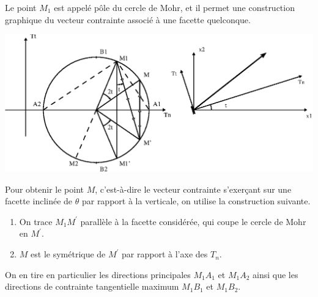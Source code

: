 Le point $M_1$ est appelé pôle du cercle de Mohr, et il permet une construction graphique du vecteur contrainte associé à une facette quelconque.
\begin{center}
    \includegraphics{../images/T1_Ch02-0018}
\end{center}
Pour obtenir le point $M$, c'est-à-dire le vecteur contrainte s'exerçant sur une facette inclinée de $\theta$ par rapport à la verticale, on utilise la construction suivante.
\begin{enumerate}
    \item On trace $M_1 M^{\prime}$ parallèle à la facette considérée, qui coupe le cercle de Mohr en $M^{\prime}$.
    \item $M$ est le symétrique de $M^{\prime}$ par rapport à l'axe des $T_n$.
\end{enumerate}
On en tire en particulier les directions principales $M_1 A_1$ et $M_1 A_2$ ainsi que les directions de contrainte tangentielle maximum $M_1 B_1$ et $M_1 B_2$. 

